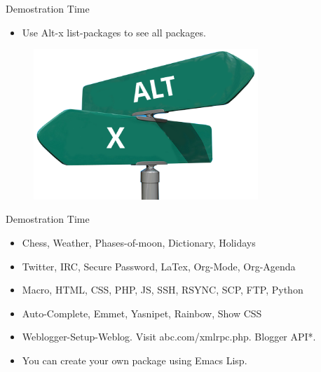 \documentclass[english,14pt,presentation]{beamer}
\begin{document}
\begin{frame}{Demostration Time}
\begin{itemize}
\pause \item Use Alt-x list-packages to see all packages.
\end{itemize}
\begin{figure}
\centering
\includegraphics[width=320]{images/altx.png}
\end{figure}
\end{frame}

\begin{frame}{Demostration Time}
\begin{itemize}
\pause \item Chess, Weather, Phases-of-moon, Dictionary, Holidays
\pause \item Twitter, IRC, Secure Password, LaTex, Org-Mode, Org-Agenda
\pause \item Macro, HTML, CSS, PHP, JS, SSH, RSYNC, SCP, FTP, Python
\pause \item Auto-Complete, Emmet, Yasnipet, Rainbow, Show CSS
\pause \item Weblogger-Setup-Weblog. Visit abc.com/xmlrpc.php. Blogger API*.
\pause \item You can create your own package using Emacs Lisp.
\end{itemize}
\end{frame}
\end{document}
